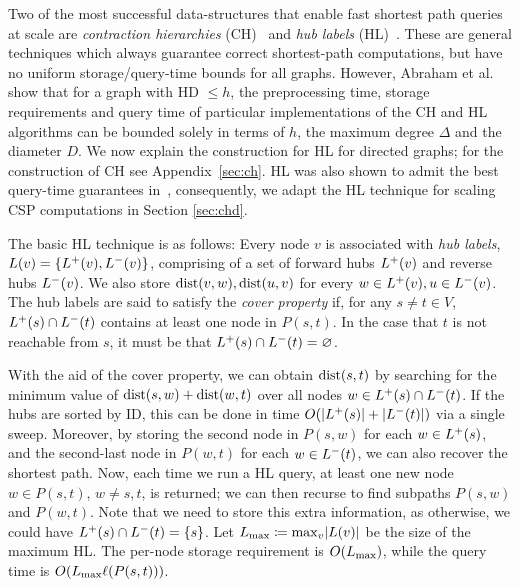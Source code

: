 Two of the most successful data-structures that enable fast shortest path queries at scale are \emph{contraction hierarchies} (CH)~\cite{geisberger_ch_definition} and \emph{hub labels} (HL)~\cite{cohen_definition_hl}.
These are general techniques which always guarantee correct shortest-path computations, but have no uniform storage/query-time bounds for all graphs.
However, Abraham et al.~\cite{highway2013} show that for a graph with HD $\leq h$, the preprocessing time, storage requirements and query time of particular implementations of the CH and HL algorithms can be bounded solely in terms of $h$, the maximum degree $\Delta$ and the diameter $D$. 
We now explain the construction for HL for directed graphs; for the construction of CH see Appendix~\ref{sec:ch}.
HL was also shown to admit the best query-time guarantees in~\cite{highway2013}, consequently, we adapt the HL technique for scaling CSP computations in Section \ref{sec:chd}.

The basic HL technique is as follows:
Every node $v$ is associated with \emph{hub labels}, $L(v) = \crl*{\Lf(v),\Lb(v)}$, comprising of a set of forward hubs $\Lf(v)$ and reverse hubs $\Lb(v)$.
We also store $\dist(v,w),\dist(u,v)$ for every $w\in\Lf(v),u\in\Lb(v)$.
The hub labels are said to satisfy the \emph{cover property} if, for any $s\neq t\in V$, $\Lf(s)\cap\Lb(t)$ contains at least one node in $P(s,t)$.
In the case that $t$ is not reachable from $s$, it must be that $\Lf(s)\cap\Lb(t)=\varnothing$.

With the aid of the cover property, we can obtain $\dist(s,t)$ by searching for the minimum value of $\dist(s,w)+\dist(w,t)$ over all nodes $w\in\Lf(s)\cap\Lb(t)$.
If the hubs are sorted by ID, this can be done in time $\Or(\card{\Lf(s)}+\card{\Lb(t)})$ via a single sweep.
Moreover, by storing the second node in $P(s,w)$ for each $w\in \Lf(s)$, and the second-last node in $P(w,t)$ for each $w\in \Lb(t)$, we can also recover the shortest path.
Now, each time we run a HL query, at least one new node $w\in P(s,t)$, $w\neq s,t$, is returned; we can then recurse to find subpaths $P(s,w)$ and $P(w,t)$.
Note that we need to store this extra information, as otherwise, we could have $\Lf(s)\cap\Lb(t)=\{s\}$.
Let $\Lm \defeq \max_v\abs*{L(v)}$ be the size of the maximum HL.
The per-node storage requirement is $\Or(\Lm)$, while the query time is $\Or(\Lm\ell(P(s,t)))$.


